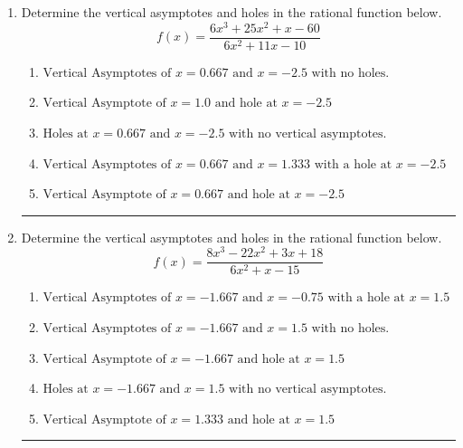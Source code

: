 \documentclass[14pt]{extbook}
\newcommand{\litem}[1]{\item#1\hspace*{-1cm}\rule{\textwidth}{0.4pt}}
\begin{document}
\begin{enumerate}
{\begin{enumerate}[label=\Alph*.]
\end{enumerate} }
\litem{
Determine the vertical asymptotes and holes in the rational function below.\[ f(x) = \frac{6x^{3} +25 x^{2} +x -60}{6x^{2} +11 x -10} \]\begin{enumerate}[label=\Alph*.]
\item \( \text{Vertical Asymptotes of } x = 0.667 \text{ and } x = -2.5 \text{ with no holes.} \)
\item \( \text{Vertical Asymptote of } x = 1.0 \text{ and hole at } x = -2.5 \)
\item \( \text{Holes at } x = 0.667 \text{ and } x = -2.5 \text{ with no vertical asymptotes.} \)
\item \( \text{Vertical Asymptotes of } x = 0.667 \text{ and } x = 1.333 \text{ with a hole at } x = -2.5 \)
\item \( \text{Vertical Asymptote of } x = 0.667 \text{ and hole at } x = -2.5 \)

\end{enumerate} }
\litem{
Determine the vertical asymptotes and holes in the rational function below.\[ f(x) = \frac{8x^{3} -22 x^{2} +3 x + 18}{6x^{2} +x -15} \]\begin{enumerate}[label=\Alph*.]
\item \( \text{Vertical Asymptotes of } x = -1.667 \text{ and } x = -0.75 \text{ with a hole at } x = 1.5 \)
\item \( \text{Vertical Asymptotes of } x = -1.667 \text{ and } x = 1.5 \text{ with no holes.} \)
\item \( \text{Vertical Asymptote of } x = -1.667 \text{ and hole at } x = 1.5 \)
\item \( \text{Holes at } x = -1.667 \text{ and } x = 1.5 \text{ with no vertical asymptotes.} \)
\item \( \text{Vertical Asymptote of } x = 1.333 \text{ and hole at } x = 1.5 \)

\end{enumerate} }
\end{enumerate}
\end{document}
